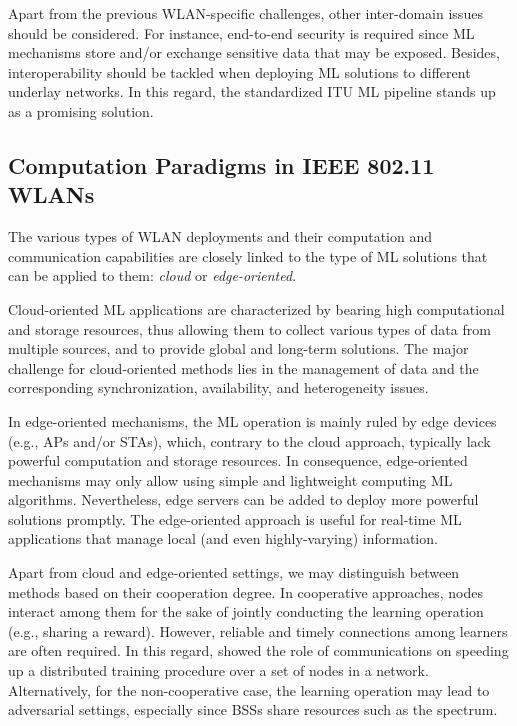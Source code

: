 \documentclass{article}
\begin{document}
Apart from the previous WLAN-specific challenges, other inter-domain issues should be considered. For instance, end-to-end security is required since ML mechanisms store and/or exchange sensitive data that may be exposed. Besides, interoperability should be tackled when deploying ML solutions to different underlay networks. In this regard, the standardized ITU ML pipeline stands up as a promising solution.

\subsection{Computation Paradigms in IEEE 802.11 WLANs}
The various types of WLAN deployments and their computation and communication capabilities are closely linked to the type of ML solutions that can be applied to them: \emph{cloud} or \emph{edge-oriented}.

Cloud-oriented ML applications are characterized by
bearing high computational and storage resources, thus allowing them to collect various types of data from multiple sources, and to provide global and long-term solutions. The major challenge for cloud-oriented methods lies in the management of data and the corresponding synchronization, availability, and heterogeneity issues.

In edge-oriented mechanisms, the ML operation is mainly ruled by edge devices (e.g., APs and/or STAs), which, contrary to the cloud approach, typically lack powerful computation and storage resources. In consequence, edge-oriented mechanisms may only allow using simple and lightweight computing ML algorithms. Nevertheless, edge servers can be added to deploy more powerful solutions promptly. The edge-oriented approach is useful for real-time ML applications that manage local (and even highly-varying) information.

Apart from cloud and edge-oriented settings, we may distinguish between methods based on their cooperation degree. In cooperative approaches, nodes interact among them for the sake of jointly conducting the learning operation (e.g., sharing a reward). However, reliable and timely connections among learners are often required. In this regard, \cite{lin2017deep} showed the role of communications on speeding up a distributed training procedure over a set of nodes in a network. Alternatively, for the non-cooperative case, the learning operation may lead to adversarial settings, especially since BSSs share resources such as the spectrum.
\end{document}
